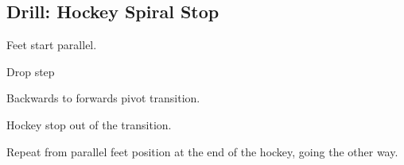 \subsection*{Drill: Hockey Spiral Stop}
\label{drill:footwork/hockey_spiral}

Feet start parallel.

Drop step

Backwards to forwards pivot transition.

Hockey stop out of the transition.

Repeat from parallel feet position at the end of the hockey, going the other way.

